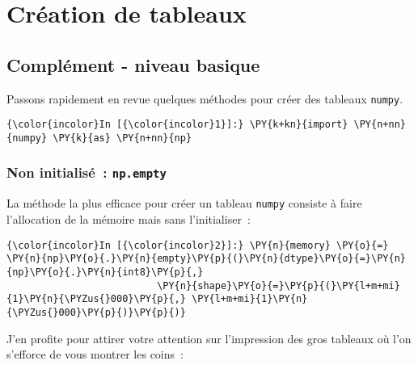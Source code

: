     
    
    
    

    

    \hypertarget{cruxe9ation-de-tableaux}{%
\section{Création de tableaux}\label{cruxe9ation-de-tableaux}}

    \hypertarget{compluxe9ment---niveau-basique}{%
\subsection{Complément - niveau
basique}\label{compluxe9ment---niveau-basique}}

    Passons rapidement en revue quelques méthodes pour créer des tableaux
\texttt{numpy}.

    \begin{Verbatim}[commandchars=\\\{\},frame=single,framerule=0.3mm,rulecolor=\color{cellframecolor}]
{\color{incolor}In [{\color{incolor}1}]:} \PY{k+kn}{import} \PY{n+nn}{numpy} \PY{k}{as} \PY{n+nn}{np}
\end{Verbatim}


    \hypertarget{non-initialisuxe9-np.empty}{%
\subsubsection{\texorpdfstring{Non initialisé~:
\texttt{np.empty}}{Non initialisé~: np.empty}}\label{non-initialisuxe9-np.empty}}

    La méthode la plus efficace pour créer un tableau \texttt{numpy}
consiste à faire l'allocation de la mémoire mais sans l'initialiser~:

    \begin{Verbatim}[commandchars=\\\{\},frame=single,framerule=0.3mm,rulecolor=\color{cellframecolor}]
{\color{incolor}In [{\color{incolor}2}]:} \PY{n}{memory} \PY{o}{=} \PY{n}{np}\PY{o}{.}\PY{n}{empty}\PY{p}{(}\PY{n}{dtype}\PY{o}{=}\PY{n}{np}\PY{o}{.}\PY{n}{int8}\PY{p}{,}
                          \PY{n}{shape}\PY{o}{=}\PY{p}{(}\PY{l+m+mi}{1}\PY{n}{\PYZus{}000}\PY{p}{,} \PY{l+m+mi}{1}\PY{n}{\PYZus{}000}\PY{p}{)}\PY{p}{)}
\end{Verbatim}


    J'en profite pour attirer votre attention sur l'impression des gros
tableaux où l'on s'efforce de vous montrer les coins~:

